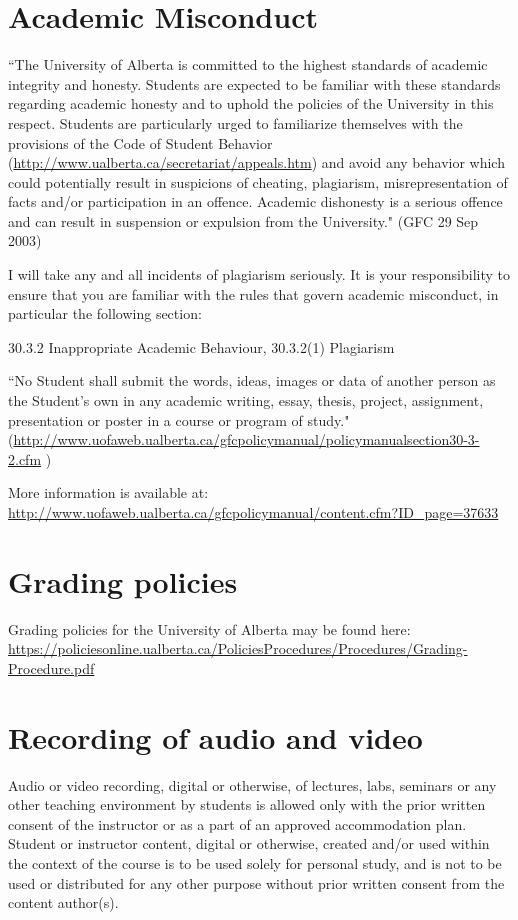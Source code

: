 \documentclass[11pt,]{article}
\begin{document}
\hypertarget{academic-misconduct}{%
\section{Academic Misconduct}\label{academic-misconduct}}

``The University of Alberta is committed to the highest standards of
academic integrity and honesty. Students are expected to be familiar
with these standards regarding academic honesty and to uphold the
policies of the University in this respect. Students are particularly
urged to familiarize themselves with the provisions of the Code of
Student Behavior (\url{http://www.ualberta.ca/secretariat/appeals.htm})
and avoid any behavior which could potentially result in suspicions of
cheating, plagiarism, misrepresentation of facts and/or participation in
an offence. Academic dishonesty is a serious offence and can result in
suspension or expulsion from the University." (GFC 29 Sep 2003)

I will take any and all incidents of plagiarism seriously. It is your
responsibility to ensure that you are familiar with the rules that
govern academic misconduct, in particular the following section:

30.3.2 Inappropriate Academic Behaviour, 30.3.2(1) Plagiarism

``No Student shall submit the words, ideas, images or data of another
person as the Student's own in any academic writing, essay, thesis,
project, assignment, presentation or poster in a course or program of
study."
(\url{http://www.uofaweb.ualberta.ca/gfcpolicymanual/policymanualsection30-3-2.cfm}
)

More information is available at:
\url{http://www.uofaweb.ualberta.ca/gfcpolicymanual/content.cfm?ID_page=37633}

\hypertarget{grading-policies}{%
\section{Grading policies}\label{grading-policies}}

Grading policies for the University of Alberta may be found here:
\url{https://policiesonline.ualberta.ca/PoliciesProcedures/Procedures/Grading-Procedure.pdf}

\hypertarget{recording-of-audio-and-video}{%
\section{Recording of audio and
video}\label{recording-of-audio-and-video}}

Audio or video recording, digital or otherwise, of lectures, labs,
seminars or any other teaching environment by students is allowed only
with the prior written consent of the instructor or as a part of an
approved accommodation plan. Student or instructor content, digital or
otherwise, created and/or used within the context of the course is to be
used solely for personal study, and is not to be used or distributed for
any other purpose without prior written consent from the content
author(s).
\end{document}
